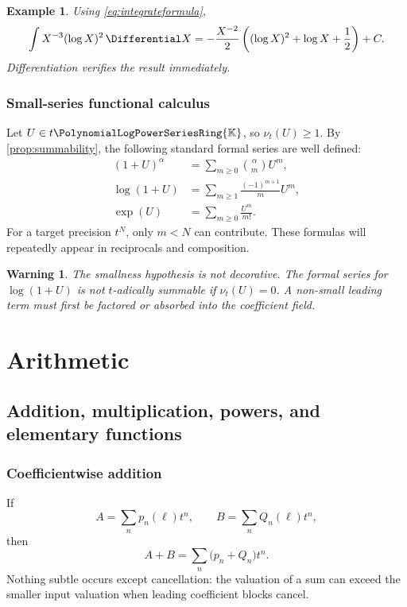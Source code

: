 \documentclass[11pt,oneside,openany]{book}
\newtheorem{example}[theorem]{Example}
\newtheorem{warning}[theorem]{Warning}
\newcommand{\K}{\mathbb{K}}
\newcommand{\Rring}{\PolynomialLogPowerSeriesRing{\K}}
\newcommand{\ordt}{\nu_t}
\begin{document}
\begin{example}
Using \cref{eq:integrateformula},
\[
 \int X^{-3}(\log X)^2\,\Differential X
 =-\frac{X^{-2}}{2}
   \left((\log X)^2+\log X+\frac12\right)+C.
\]
Differentiation verifies the result immediately.
\end{example}

\section{Small-series functional calculus}
Let \(U\in t\Rring\), so \(\ordt(U)\geq1\).  By
\cref{prop:summability}, the following standard formal series are well defined:
\begin{align}
 (1+U)^\alpha&=\sum_{m\geq0}\binom{\alpha}{m}U^m,
 \label{eq:binomialsmall}\\
 \log(1+U)&=\sum_{m\geq1}\frac{(-1)^{m+1}}{m}U^m,
 \label{eq:logsmall}\\
 \exp(U)&=\sum_{m\geq0}\frac{U^m}{m!}.
 \label{eq:expsmall}
\end{align}
For a target precision \(t^N\), only \(m<N\) can contribute.  These formulas
will repeatedly appear in reciprocals and composition.

\begin{warning}
The smallness hypothesis is not decorative.  The formal series for
\(\log(1+U)\) is not \(t\)-adically summable if \(\ordt(U)=0\).  A non-small
leading term must first be factored or absorbed into the coefficient field.
\end{warning}


\part{Arithmetic}

\chapter{Addition, multiplication, powers, and elementary functions}
\label{ch:multiplication}

\section{Coefficientwise addition}
If
\[
 A=\sum_np_n(\ell)t^n,
 \qquad
 B=\sum_nQ_n(\ell)t^n,
\]
then
\begin{equation}\label{eq:addition}
 A+B=\sum_n\bigl(p_n+Q_n\bigr)t^n.
\end{equation}
Nothing subtle occurs except cancellation: the valuation of a sum can exceed
the smaller input valuation when leading coefficient blocks cancel.
\end{document}
